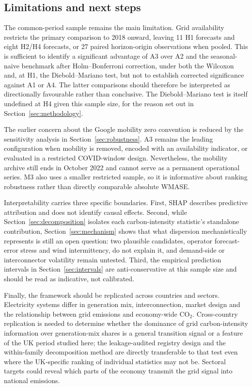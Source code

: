 \documentclass[preprint,12pt]{elsarticle}
\newcommand{\coo}{CO$_2$}
\begin{document}
\subsection{Limitations and next steps}\label{sec:limitations}

The common-period sample remains the main limitation. Grid availability restricts the primary comparison to 2018 onward, leaving 11 H1 forecasts and eight H2/H4 forecasts, or 27 paired horizon-origin observations when pooled. This is sufficient to identify a significant advantage of A3 over A2 and the seasonal-naive benchmark after Holm--Bonferroni correction, under both the Wilcoxon and, at H1, the Diebold--Mariano test, but not to establish corrected significance against A1 or A4. The latter comparisons should therefore be interpreted as directionally favourable rather than conclusive. The Diebold--Mariano test is itself undefined at H4 given this sample size, for the reason set out in Section~\ref{sec:methodology}.

The earlier concern about the Google mobility zero convention is reduced by the sensitivity analysis in Section~\ref{sec:robustness}. A3 remains the leading configuration when mobility is removed, encoded with an availability indicator, or evaluated in a restricted COVID-window design. Nevertheless, the mobility archive still ends in October 2022 and cannot serve as a permanent operational series. M3 also uses a smaller restricted sample, so it is informative about ranking robustness rather than directly comparable absolute WMASE.

Interpretability carries three specific boundaries. First, SHAP describes predictive attribution and does not identify causal effects. Second, while Section~\ref{sec:decomposition} isolates each carbon-intensity statistic's standalone contribution, Section~\ref{sec:mechanism} shows that what dispersion mechanistically represents is still an open question: two plausible candidates, operator forecast-error stress and wind intermittency, do not explain it, and demand-side or interconnector volatility remain untested. Third, the empirical prediction intervals in Section~\ref{sec:intervals} are anti-conservative at this sample size and should be read as indicative, not calibrated.

Finally, the framework should be replicated across countries and sectors. Electricity systems differ in generation mix, interconnection, market design and the relationship between grid emissions and economy-wide \coo{}. Cross-country replication is needed to determine whether the dominance of grid carbon-intensity information over generation-mix shares is a general transition signal or a feature of the UK period studied here; the leakage-audited registry design and the within-family decomposition method are directly transferable to that test even where the UK-specific ranking of individual statistics may not be. Sectoral targets could reveal which parts of the economy transmit the grid signal into national emissions.
\end{document}
